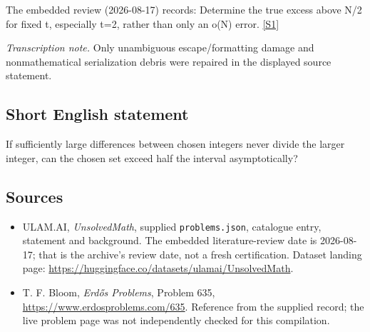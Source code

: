 \documentclass[11pt,a4paper]{article}
\newcommand{\sref}[2]{\hyperlink{source:#1:#2}{[S#2]}}
\begin{document}
The embedded review (2026-08-17) records: Determine the true excess above N/2 for fixed t, especially t=2, rather than only an o(N) error. \sref{statement}{1}

{\small\emph{Transcription note.} Only unambiguous escape/formatting damage and nonmathematical serialization debris were repaired in the displayed source statement.}

\subsection{Short English statement}

If sufficiently large differences between chosen integers never divide the larger integer, can the chosen set exceed half the interval asymptotically?

\subsection{Sources}

{\small

\begin{itemize}

\item[\hypertarget{source:statement:1}{S1}] ULAM.AI, \emph{UnsolvedMath}, supplied \texttt{problems.json}, catalogue entry, statement and background. The embedded literature-review date is 2026-08-17; that is the archive’s review date, not a fresh certification. Dataset landing page: \url{https://huggingface.co/datasets/ulamai/UnsolvedMath}.

\item[\hypertarget{source:statement:2}{S2}] T. F. Bloom, \emph{Erdős Problems}, Problem 635, \url{https://www.erdosproblems.com/635}. Reference from the supplied record; the live problem page was not independently checked for this compilation.

\end{itemize}

}

\label{end:statement}
\end{document}
